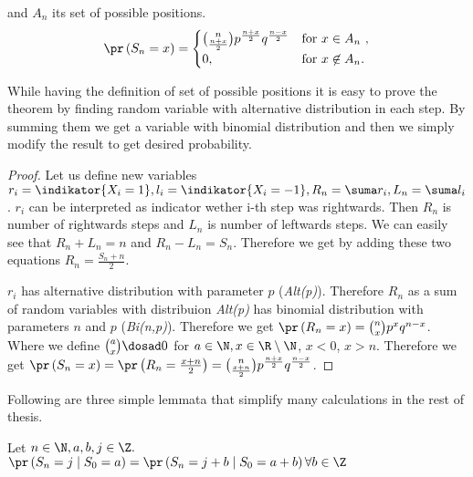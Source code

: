 \begin{thm}\label{thm-probability_position_time}
 \Lrw and $A_n$ its set of possible positions.
 \[
 \pr \left( S_n=x \right) =
 \begin{cases}
 \binom{n}{\frac{n+x}{2}}p^{\frac{n+x}{2}}q^{\frac{n-x}{2}} & \text{for $x \in A_n$ },\\
 0, & \text{for $x \not\in A_n$}.
 \end{cases}
 \]

\end{thm}

\begin{rem}
  While having the definition of set of possible positions it is easy to prove the theorem by finding random variable with alternative distribution in each step. By summing them we get a variable with binomial distribution and then we simply modify the result to get desired probability.
\end{rem}

\begin{proof}
 Let us define new variables $r_i=\indikator{X_i=1}, l_i=\indikator{X_i=-1}, R_n=\suma r_i, L_n=\suma l_i$.
 $r_i$ can be interpreted as indicator wether i-th step was rightwards. Then $R_n$ is number of rightwards steps and $L_n$ is number of leftwards steps. We can easily see that $R_n+L_n=n$ and $R_n-L_n=S_n$.
 Therefore we get by adding these two equations $R_n=\frac{S_n+n}{2}.$

 $r_i$ has alternative distribution with parameter $p$ (\textit{Alt(p)}). Therefore $R_n$ as a sum of \iid random variables with distribuion \textit{Alt(p)} has binomial distribution with parameters $n$ and $p$ (\textit{Bi(n,p)}).
 Therefore we get $\pr \left(R_n=x \right) =\binom{n}{x}p^{x}q^{n-x}$. Where we define $\binom{a}{x}\dosad 0$ for $a \in \N, x\in \R \setminus \N$, $x<0$, $x>n$.
 Therefore we get $\pr \left( S_n=x \right) =\pr\left( R_n=\frac{x+n}{2} \right) = \binom{n}{\frac{x+n}{2}}p^{\frac{n+x}{2}}q^{\frac{n-x}{2}}$.
\end{proof}

\begin{rem}
  Following are three simple lemmata that simplify many calculations in the rest of thesis.
\end{rem}

\begin{lemma}\label{lemma-spatial_homogeneity}
  Let $n \in \N, a,b,j \in \Z.$
 $\pr \left( S_n=j \mid S_0=a \right) =\pr \left( S_n=j+b \mid S_0=a+b \right) \forall b \in \Z$
\end{lemma}

